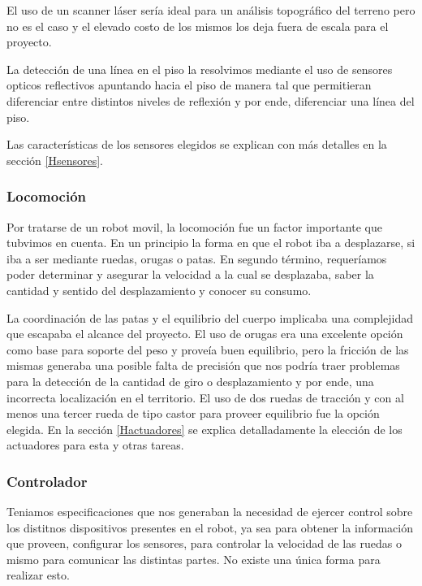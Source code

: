 El uso de un scanner l\'aser ser\'ia ideal para un an\'alisis topogr\'afico del terreno pero no es el caso y el elevado costo de los mismos los
deja fuera de escala para el proyecto.

La detecci\'on de una l\'inea en el piso la resolvimos mediante el uso de sensores opticos reflectivos apuntando hacia el piso de manera tal que
permitieran diferenciar entre distintos niveles de reflexi\'on y por ende, diferenciar una l\'inea del piso.

Las caracter\'isticas de los sensores elegidos se explican con m\'as detalles en la secci\'on \ref{Hsensores}.

\subsubsection{Locomoci\'on}

Por tratarse de un robot movil, la locomoci\'on fue un factor importante que tubvimos en cuenta. En un principio la forma en que el robot iba a desplazarse,
si iba a ser mediante ruedas, orugas o patas. En segundo t\'ermino, requer\'iamos poder determinar y asegurar la velocidad a la cual se desplazaba,
saber la cantidad y sentido del desplazamiento y conocer su consumo.

La coordinaci\'on de las patas y el equilibrio del cuerpo implicaba una complejidad que escapaba el alcance del proyecto. El uso de orugas era una
excelente opci\'on como base para soporte del peso y prove\'ia buen equilibrio, pero la fricci\'on de las mismas generaba una posible falta de
precisi\'on que nos podr\'ia traer problemas para la detecci\'on de la cantidad de giro o desplazamiento y por ende, una incorrecta localizaci\'on en
el territorio. El uso de dos ruedas de tracci\'on y con al menos una tercer rueda de tipo castor para proveer equilibrio fue la opci\'on elegida.
En la secci\'on \ref{Hactuadores} se explica detalladamente la elecci\'on de los actuadores para esta y otras tareas.

\subsubsection{Controlador}

Teniamos especificaciones que nos generaban la necesidad de ejercer control sobre los distitnos dispositivos presentes en el robot, ya sea para
obtener la informaci\'on que proveen, configurar los sensores, para controlar la velocidad de las ruedas o mismo para comunicar las distintas partes.
No existe una \'unica forma para realizar esto.

